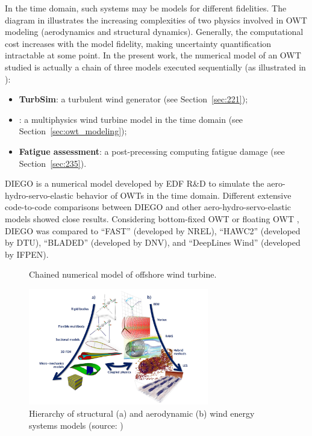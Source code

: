 In the time domain, such systems may be models for different fidelities. 
The diagram in  illustrates the increasing complexities of two physics involved in OWT modeling (aerodynamics and structural dynamics). 
Generally, the computational cost increases with the model fidelity, making uncertainty quantification intractable at some point. 
In the present work, the numerical model of an OWT studied is actually a chain of three models executed sequentially (as illustrated in ): 
\begin{itemize}
    \item \textbf{TurbSim}: a turbulent wind generator (see Section~\ref{sec:221});
    \item \textbf{}: a multiphysics wind turbine model in the time domain (see Section~\ref{sec:owt_modeling}); 
    \item \textbf{Fatigue assessment}: a post-precessing computing fatigue damage (see Section~\ref{sec:235}). 
\end{itemize}
DIEGO is a numerical model developed by EDF R\&D to simulate the aero-hydro-servo-elastic behavior of OWTs in the time domain. 
Different extensive code-to-code comparisons between DIEGO and other aero-hydro-servo-elastic models showed close results. 
Considering bottom-fixed OWT \citep{popko_2021_DIEGO_benchmark} or floating OWT \citep{robertson_2020_diego_benchmark,kim_natarajan_2022}, DIEGO was compared to ``FAST'' (developed by NREL), ``HAWC2'' (developed by DTU), ``BLADED'' (developed by DNV), and ``DeepLines Wind'' (developed by IFPEN). 

\begin{figure}[h]
    \centering
    
    \caption{Chained numerical model of offshore wind turbine.}
    \label{fig:owt_chained_model}
\end{figure}


\begin{figure}
    \centering
    \includegraphics[width=0.7\textwidth]{./part1/figures/OWT_modeling_fidelities.png}
    \caption{Hierarchy of structural (a) and aerodynamic (b) wind energy systems models (source: \citealp{veers_2019_review})}
    \label{fig:owt_modeling_fidelities}
\end{figure}



